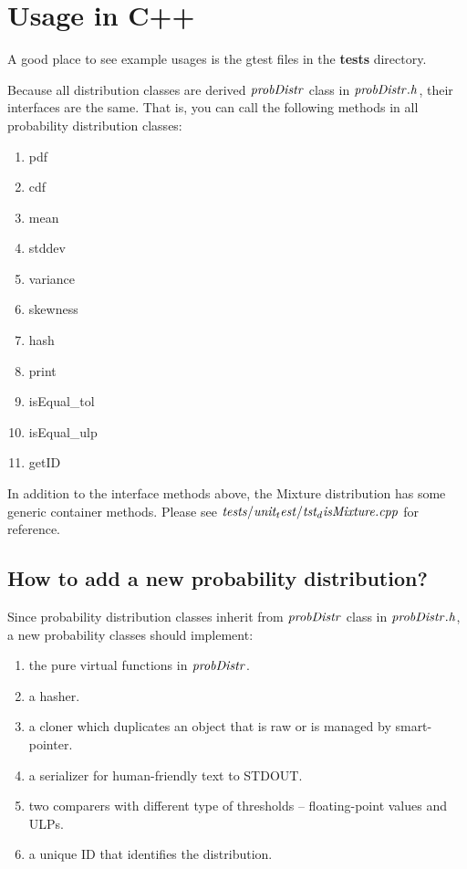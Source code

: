 \section{Usage in C++}

A good place to see example usages is the gtest files in the \textbf{tests} directory.

Because all distribution classes are derived \(\it{probDistr}\) class in \(\it{probDistr.h}\), 
their interfaces are the same. That is, you can call the following methods 
in all probability distribution classes:
\begin{enumerate}
    \item pdf
    \item cdf
    \item mean
    \item stddev
    \item variance
    \item skewness
    \item hash
    \item print
    \item isEqual\_tol
    \item isEqual\_ulp
    \item getID
\end{enumerate}

In addition to the interface methods above, the Mixture distribution has some generic container methods.
Please see \(\it{tests/unit_test/tst_disMixture.cpp}\) for reference.



\subsection{How to add a new probability distribution?}

Since probability distribution classes inherit from \(\it{probDistr}\) class in \(\it{probDistr.h}\), 
a new probability classes should implement:
\begin{enumerate}
    \item the pure virtual functions in \(\it{probDistr}\).
    \item a hasher.
    \item a cloner which duplicates an object that is raw or is managed by smart-pointer.
    \item a serializer for human-friendly text to STDOUT.
    \item two comparers with different type of thresholds -- floating-point values and ULPs.
    \item a unique ID that identifies the distribution.
\end{enumerate} 



